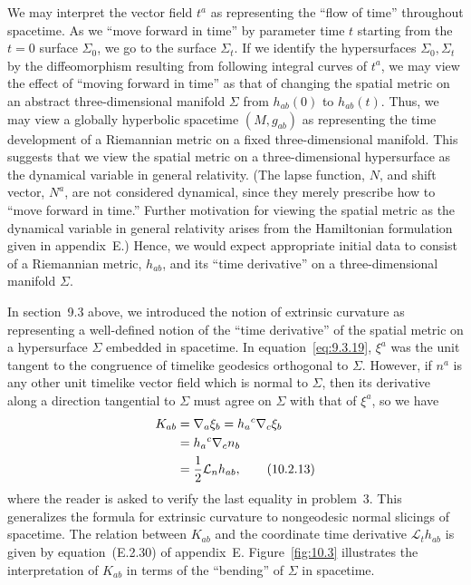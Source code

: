 We may interpret the vector field \(t^a\) as representing the ``flow of time''
throughout spacetime. As we ``move forward in time'' by parameter time \(t\) starting
from the \(t=0\) surface \(\Sigma_0\), we go to the surface \(\Sigma_t\). If we
identify the hypersurfaces \(\Sigma_0,\Sigma_t\) by the diffeomorphism resulting from
following integral curves of \(t^a\), we may view the effect of ``moving forward in
time'' as that of changing the spatial metric on an abstract three-dimensional manifold
\(\Sigma\) from \(h_{ab}(0)\) to \(h_{ab}(t)\). Thus, we may view a globally
hyperbolic spacetime \((M,g_{ab})\) as representing the time development of a
Riemannian metric on a fixed three-dimensional manifold. This suggests that we view
the spatial metric on a three-dimensional hypersurface as the dynamical variable in
general relativity. (The lapse function, \(N\), and shift vector, \(N^a\), are not
considered dynamical, since they merely prescribe how to ``move forward in time.''
Further motivation for viewing the spatial metric as the dynamical variable in general
relativity arises from the Hamiltonian formulation given in appendix~E.) Hence, we
would expect appropriate initial data to consist of a Riemannian metric, \(h_{ab}\), and
its ``time derivative'' on a three-dimensional manifold \(\Sigma\).

In section~9.3 above, we introduced the notion of extrinsic curvature as representing
a well-defined notion of the ``time derivative'' of the spatial metric on a hypersurface
\(\Sigma\) embedded in spacetime. In equation~\eqref{eq:9.3.19}, \(\xi^a\) was the
unit tangent to the congruence of timelike geodesics orthogonal to \(\Sigma\). However,
if \(n^a\) is any other unit timelike vector field which is normal to \(\Sigma\), then
its derivative along a direction tangential to \(\Sigma\) must agree on \(\Sigma\) with
that of \(\xi^a\), so we have
\begin{align}
  K_{ab}
  &=\nabla_a\xi_b=h_a{}^c\nabla_c\xi_b \notag\\
  &=h_a{}^c\nabla_cn_b \notag\\
  &=\frac12\mathcal L_nh_{ab},
  \tag{10.2.13}\label{eq:10.2.13}
\end{align}
where the reader is asked to verify the last equality in problem~3. This generalizes
the formula for extrinsic curvature to nongeodesic normal slicings of spacetime. The
relation between \(K_{ab}\) and the coordinate time derivative
\(\mathcal L_th_{ab}\) is given by equation~(E.2.30) of appendix~E.
Figure~\ref{fig:10.3} illustrates the interpretation of \(K_{ab}\) in terms of the
``bending'' of \(\Sigma\) in spacetime.

